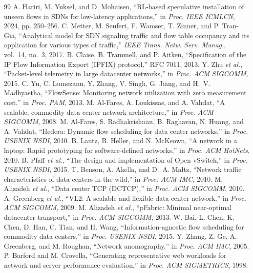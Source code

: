 \documentclass[sigconf]{acmart}
\begin{document}
\begin{thebibliography}{99}
 A. Hariri, M. Yuksel, and D. Mohaisen, ``RL-based speculative installation of unseen flows in SDNs for low-latency applications,'' in \emph{Proc. IEEE ICMLCN}, 2024, pp. 250--256.
 C. Metter, M. Seufert, F. Wamser, T. Zinner, and P. Tran-Gia, ``Analytical model for SDN signaling traffic and flow table occupancy and its application for various types of traffic,'' \emph{IEEE Trans. Netw. Serv. Manag.}, vol.~14, no.~3, 2017.
 B. Claise, B. Trammell, and P. Aitken, ``Specification of the IP Flow Information Export (IPFIX) protocol,'' RFC 7011, 2013.
 Y. Zhu \emph{et al.}, ``Packet-level telemetry in large datacenter networks,'' in \emph{Proc. ACM SIGCOMM}, 2015.
 C. Yu, C. Lumezanu, Y. Zhang, V. Singh, G. Jiang, and H.~V. Madhyastha, ``FlowSense: Monitoring network utilization with zero measurement cost,'' in \emph{Proc. PAM}, 2013.
 M. Al-Fares, A. Loukissas, and A. Vahdat, ``A scalable, commodity data center network architecture,'' in \emph{Proc. ACM SIGCOMM}, 2008.
 M. Al-Fares, S. Radhakrishnan, B. Raghavan, N. Huang, and A. Vahdat, ``Hedera: Dynamic flow scheduling for data center networks,'' in \emph{Proc. USENIX NSDI}, 2010.
 B. Lantz, B. Heller, and N. McKeown, ``A network in a laptop: Rapid prototyping for software-defined networks,'' in \emph{Proc. ACM HotNets}, 2010.
 B. Pfaff \emph{et al.}, ``The design and implementation of Open vSwitch,'' in \emph{Proc. USENIX NSDI}, 2015.
 T. Benson, A. Akella, and D.~A. Maltz, ``Network traffic characteristics of data centers in the wild,'' in \emph{Proc. ACM IMC}, 2010.
 M. Alizadeh \emph{et al.}, ``Data center TCP (DCTCP),'' in \emph{Proc. ACM SIGCOMM}, 2010.
 A. Greenberg \emph{et al.}, ``VL2: A scalable and flexible data center network,'' in \emph{Proc. ACM SIGCOMM}, 2009.
 M. Alizadeh \emph{et al.}, ``pFabric: Minimal near-optimal datacenter transport,'' in \emph{Proc. ACM SIGCOMM}, 2013.
 W. Bai, L. Chen, K. Chen, D. Han, C. Tian, and H. Wang, ``Information-agnostic flow scheduling for commodity data centers,'' in \emph{Proc. USENIX NSDI}, 2015.
 Y. Zhang, Z. Ge, A. Greenberg, and M. Roughan, ``Network anomography,'' in \emph{Proc. ACM IMC}, 2005.
 P. Barford and M. Crovella, ``Generating representative web workloads for network and server performance evaluation,'' in \emph{Proc. ACM SIGMETRICS}, 1998.
\end{thebibliography}
\end{document}
